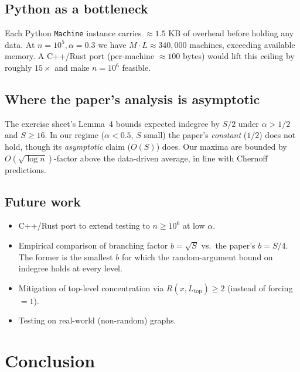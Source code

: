 \documentclass[11pt]{article}
\begin{document}
\subsection{Python as a bottleneck}

Each Python \texttt{Machine} instance carries $\approx 1.5$ KB of overhead
before holding any data. At $n = 10^5, \alpha = 0.3$ we have
$M \cdot L \approx 340{,}000$ machines, exceeding available memory.
A C++/Rust port (per-machine $\approx 100$ bytes) would lift this ceiling
by roughly $15\times$ and make $n = 10^6$ feasible.

\subsection{Where the paper's analysis is asymptotic}

The exercise sheet's Lemma~4 bounds expected indegree by $S/2$ under
$\alpha > 1/2$ and $S \ge 16$. In our regime ($\alpha < 0.5$, $S$ small)
the paper's \textit{constant} ($1/2$) does not hold, though its
\textit{asymptotic} claim ($O(S)$) does. Our maxima are bounded by
$O(\sqrt{\log n})$-factor above the data-driven average, in line with
Chernoff predictions.

\subsection{Future work}

\begin{itemize}[topsep=2pt, itemsep=2pt, leftmargin=*]
    \item C++/Rust port to extend testing to $n \ge 10^6$ at low
          $\alpha$.
    \item Empirical comparison of branching factor $b = \sqrt{S}$ vs.\
          the paper's $b = S/4$. The former is the smallest $b$ for which
          the random-argument bound on indegree holds at every level.
    \item Mitigation of top-level concentration via $R(x, L_\text{top})
          \ge 2$ (instead of forcing $= 1$).
    \item Testing on real-world (non-random) graphs.
\end{itemize}

\section{Conclusion}
\end{document}
